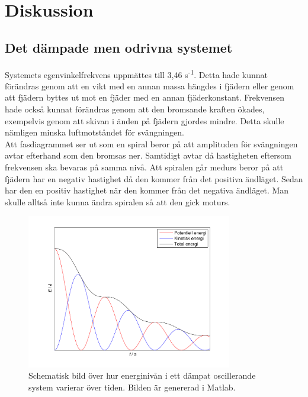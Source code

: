 \documentclass[a4paper,10pt]{article}
\begin{document}
\section{Diskussion}
\subsection{Det dämpade men odrivna systemet}
Systemets egenvinkelfrekvens uppmättes till 3,46 s\textsuperscript{-1}. Detta hade kunnat förändras genom att en vikt med en annan massa hängdes i fjädern eller genom att fjädern byttes ut mot en fjäder med en annan fjäderkonstant. Frekvensen hade också kunnat förändras genom att den bromsande kraften ökades, exempelvis genom att skivan i änden på fjädern gjordes mindre. Detta skulle nämligen minska luftmotståndet för svängningen.\\
\indent Att fasdiagrammet ser ut som en spiral beror på att amplituden för svängningen avtar efterhand som den bromsas ner. Samtidigt avtar då hastigheten eftersom frekvensen ska bevaras på samma nivå. Att spiralen går medurs beror på att fjädern har en negativ hastighet då den kommer från det positiva ändläget. Sedan har den en positiv hastighet när den kommer från det negativa ändläget. Man skulle alltså inte kunna ändra spiralen så att den gick moturs.
\begin{figure}[H]
\centering
\includegraphics[width=0.8\textwidth]{../bilder/energigraf_uppg1_ideal.pdf}
\caption{Schematisk bild över hur energinivån i ett dämpat oscillerande system varierar över tiden. Bilden är genererad i Matlab.}
\end{figure}
\end{document}
